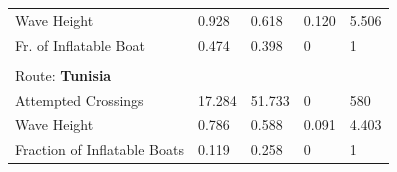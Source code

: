 \begin{tabular}{L{10cm}C{2cm}C{2cm}C{2cm}C{2cm}}
Wave Height                                  & 0.928   & 0.618   & 0.120 & 5.506 \\
Fr. of Inflatable Boat                       & 0.474   & 0.398   & 0     & 1     \\
&         &         &       &       \\
Route: \textbf{Tunisia}                               &         &         &       &       \\
Attempted Crossings                          & 17.284  & 51.733  & 0     & 580   \\
Wave Height                                  & 0.786   & 0.588   & 0.091 & 4.403 \\
Fraction of Inflatable Boats                 & 0.119   & 0.258   & 0     & 1     \\
\bottomrule\bottomrule 
\end{tabular}%










